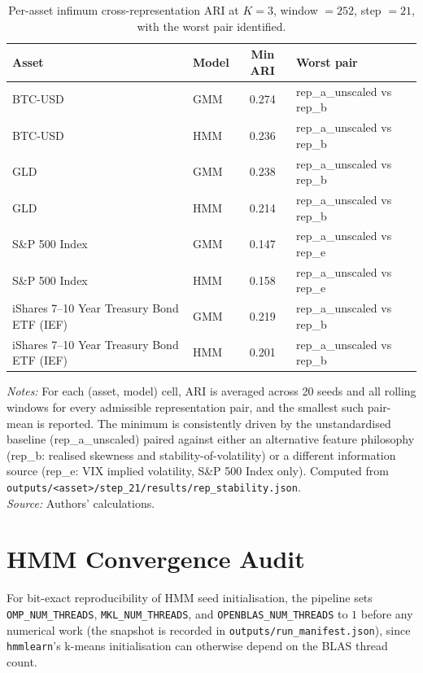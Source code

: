 \documentclass[preprint,12pt,authoryear]{elsarticle}
\newcommand{\SPX}{S\&P 500 Index}
\newcommand{\IEF}{iShares 7--10 Year Treasury Bond ETF (IEF)}
\begin{document}
\begin{table}[!htbp]
\centering
\small
\setlength{\tabcolsep}{6pt}
\caption{Per-asset infimum cross-representation ARI at $K=3$, window $=252$, step $=21$, with the worst pair identified.}
\label{tab:infimum}
\begin{tabular}{llcl}
\toprule
Asset & Model & Min ARI & Worst pair \\
\midrule
BTC-USD & GMM & 0.274 & rep\_a\_unscaled vs rep\_b \\
BTC-USD & HMM & 0.236 & rep\_a\_unscaled vs rep\_b \\
GLD     & GMM & 0.238 & rep\_a\_unscaled vs rep\_b \\
GLD     & HMM & 0.214 & rep\_a\_unscaled vs rep\_b \\
\SPX{}  & GMM & 0.147 & rep\_a\_unscaled vs rep\_e \\
\SPX{}  & HMM & 0.158 & rep\_a\_unscaled vs rep\_e \\
\IEF{}  & GMM & 0.219 & rep\_a\_unscaled vs rep\_b \\
\IEF{}  & HMM & 0.201 & rep\_a\_unscaled vs rep\_b \\
\bottomrule
\end{tabular}
\par\medskip
\begin{minipage}{\linewidth}
\footnotesize
\textit{Notes:} For each (asset, model) cell, ARI is averaged across 20 seeds and all rolling windows for every admissible representation pair, and the smallest such pair-mean is reported. The minimum is consistently driven by the unstandardised baseline (rep\_a\_unscaled) paired against either an alternative feature philosophy (rep\_b: realised skewness and stability-of-volatility) or a different information source (rep\_e: VIX implied volatility, \SPX{} only). Computed from \texttt{outputs/<asset>/step\_21/results/rep\_stability.json}. \\
\textit{Source:} Authors' calculations.
\end{minipage}
\end{table}

\section{HMM Convergence Audit}
\label{app:convergence}

For bit-exact reproducibility of HMM seed initialisation, the pipeline sets \texttt{OMP\_NUM\_THREADS}, \texttt{MKL\_NUM\_THREADS}, and \texttt{OPENBLAS\_NUM\_THREADS} to $1$ before any numerical work (the snapshot is recorded in \texttt{outputs/run\_manifest.json}), since \texttt{hmmlearn}'s k-means initialisation can otherwise depend on the BLAS thread count.
\end{document}
